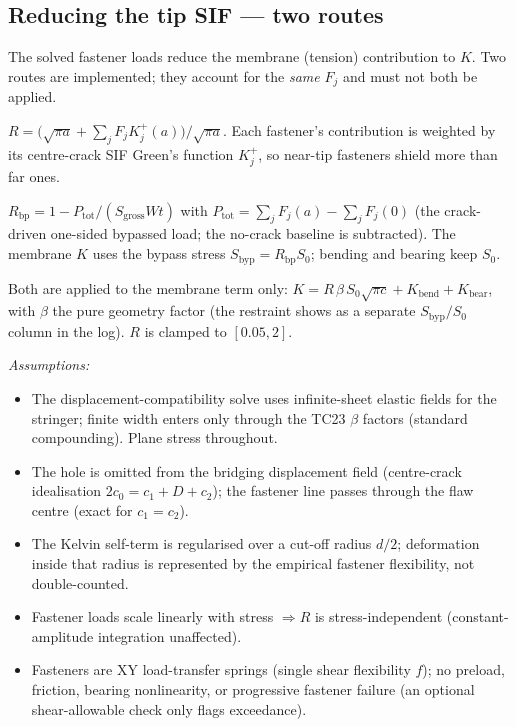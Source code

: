 \documentclass[11pt]{article}
\newenvironment{assume}{\par\smallskip\noindent\textit{Assumptions:}\begin{itemize}[leftmargin=1.5em,topsep=2pt,itemsep=1pt]}{\end{itemize}\par\smallskip}
\begin{document}
\subsection{Reducing the tip SIF --- two routes}
The solved fastener loads reduce the membrane (tension) contribution to $K$.
Two routes are implemented; they account for the \emph{same} $F_j$ and must not
both be applied.
\begin{description}[leftmargin=1.5em]
\item[Weight-function (crack-tip shielding).]
  $R=\bigl(\sqrt{\pi a}+\sum_j F_j K^+_j(a)\bigr)/\sqrt{\pi a}$. Each fastener's
  contribution is weighted by its centre-crack SIF Green's function $K^+_j$, so
  near-tip fasteners shield more than far ones.
\item[Load bypass (load-path).]
  $R_{\text{bp}}=1-P_{\text{tot}}/(S_{\text{gross}}Wt)$ with
  $P_{\text{tot}}=\sum_j F_j(a)-\sum_j F_j(0)$ (the crack-driven one-sided
  bypassed load; the no-crack baseline is subtracted). The membrane $K$ uses the
  bypass stress $S_{\text{byp}}=R_{\text{bp}}S_0$; bending and bearing keep $S_0$.
\end{description}
Both are applied to the membrane term only:
$K=R\,\beta\,S_0\sqrt{\pi c}+K_{\text{bend}}+K_{\text{bear}}$, with $\beta$ the
pure geometry factor (the restraint shows as a separate $S_{\text{byp}}/S_0$
column in the log). $R$ is clamped to $[0.05,2]$.

\begin{assume}
\item The displacement-compatibility solve uses infinite-sheet elastic fields
  for the stringer; finite width enters only through the TC23 $\beta$ factors
  (standard compounding). Plane stress throughout.
\item The hole is omitted from the bridging displacement field (centre-crack
  idealisation $2c_0=c_1+D+c_2$); the fastener line passes through the flaw
  centre (exact for $c_1=c_2$).
\item The Kelvin self-term is regularised over a cut-off radius $d/2$;
  deformation inside that radius is represented by the empirical fastener
  flexibility, not double-counted.
\item Fastener loads scale linearly with stress $\Rightarrow R$ is
  stress-independent (constant-amplitude integration unaffected).
\item Fasteners are XY load-transfer springs (single shear flexibility $f$); no
  preload, friction, bearing nonlinearity, or progressive fastener failure
  (an optional shear-allowable check only flags exceedance).
\end{assume}
\end{document}
